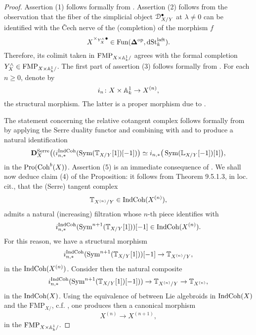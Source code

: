\documentclass[10pt,a4paper,reqno]{amsart} %
\theoremstyle{plain}
\theoremstyle{definition}
\theoremstyle{remark}
\numberwithin{equation}{section}
\begin{document}
\begin{proof}
    Assertion (1) follows formally from \cite[\S 9, Proposition 2.3.6]{Gaitsgory_Study_II}. Assertion (2) follows from the observation that
    the fiber of the simplicial object $\mathcal D_{X/ Y}^\bullet$ at $\lambda \neq 0$ can be identified with the \v{C}ech nerve of the (completion) of the morphism $f$
        \[
            X^{\times_{Y^\wedge_X} \bullet} \in \operatorname{Fun}(\bm{\Delta} ^\mathrm{op}, \mathrm{dSt}_k^{\mathrm{laft}}).
        \]
    Therefore, its colimit taken in $\mathrm{FMP}_{X \times \mathbb A^1_k/}$ agrees with the formal completion $Y^\wedge_X \in \mathrm{FMP}_{X \times \mathbb A^1_k/ }$. The first part of assertion (3) follows
    formally from \cite[\S 9, Theorem 5.1.3]{Gaitsgory_Study_II}. For each $n \ge 0$, denote by 
    \[i_n \colon X \times \mathbb A^1_k \to X^{(n)},\]
    the structural morphism. The latter is a proper morphism due to \cite[\href{https://stacks.math.columbia.edu/tag/0CYK}{Tag 0CYK}]{stacks-project}.

    The statement concerning the relative cotangent complex follows formally from
    \cite[\S 9, Theorem 5.1.3]{Gaitsgory_Study_II} by applying the Serre duality functor and combining
    \cite[Corollary 9.5.9 (b)]{Gaitsgory_IndCoh} with \cite[Proposition 3.1.3]{Gaitsgory_IndCoh} and \cite[Corollary 1.4.4.2]{Gaitsgory_Study_II}
    to produce a natural identification
        \[
            \mathbf D^\mathrm{Serre}_X \big((i_{n, *}^{\mathrm{Ind}\mathrm{Coh}}(\operatorname{Sym}(\mathbb T_{X/ Y}[1])[-1]) \big)   \simeq i_{n, *} \big(\operatorname{Sym}(\mathbb L_{X/ Y}[-1])[1] \big),
        \]
    in the \infcat $\mathrm{Pro}(\mathrm{Coh}^b(X))$.
    Assertion (5) is an immediate consequence of \cite[\S 9, Proposition 5.2.2]{Gaitsgory_Study_II}.
    We shall now deduce claim (4) of the Proposition:
    it follows from
    Theorem 9.5.1.3, in loc. cit.,
    that the (Serre) tangent complex
        \[
            \mathbb T_{X^{(n)}/ Y } \in \mathrm{Ind}\mathrm{Coh}(X^{(n)}),  
        \]
    admits a natural (increasing) filtration whose $n$-th piece identifies with 
        \[i_{n, *}^\mathrm{IndCoh}(\operatorname{Sym}^{n+1}(\mathbb T_{X/Y}[1]))[-1] \in \mathrm{Ind}\mathrm{Coh}(X^{(n)}).\]
    For this reason, we have a structural morphism
        \[
            i_{n, *}^\mathrm{IndCoh}(\operatorname{Sym}^{n+1}(\mathbb T_{X/Y}[1]))[-1] \to \mathbb T_{X^{(n)}/ Y},
        \]
    in the \infcat $\mathrm{Ind}\mathrm{Coh}(X^{(n)})$. Consider then the natural composite
        \[
            i_{n, *}^\mathrm{IndCoh}(  \operatorname{Sym}^{n+1}(\mathbb T_{X/ Y}[1])[-1])) \to \mathbb T_{X^{(n)}/ Y} \to \mathbb T_{X^{(n)}},
        \]
    in the \infcat $\mathrm{Ind}\mathrm{Coh}(X)$. Using the equivalence of \infcats between Lie algebroids in $\mathrm{Ind}\mathrm{Coh}(X)$ and the \infcat
    $\mathrm{FMP}_{X/ }$, c.f. \cite[\S 8.5]{Gaitsgory_Study_II}, one produces then a canonical morphism
        \[
            X^{(n)} \to X^{(n+1)},
        \]
    in the \infcat $\mathrm{FMP}_{X \times \mathbb A^1_k/ }$.
    

\end{proof}
\end{document}

